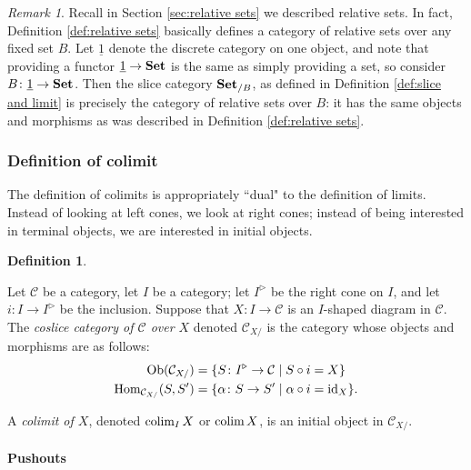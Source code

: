 \documentclass{book}
\def\tn{\textnormal}
\def\mc{\mathcal}
\def\Hom{\tn{Hom}}
\def\Ob{\tn{Ob}}
\def\rcone{^\triangleright}
\def\to{\rightarrow}
\def\taking{\colon}
\def\|{{\;|\;}}
\def\ul{\underline}
\def\id{\tn{id}}
\def\Set{{\bf Set}}
\def\colim{\mathop{\tn{colim}}}
\def\mcC{\mc{C}}
\theoremstyle{remark}
\newtheorem{remark}[subsubsection]{Remark}
\theoremstyle{definition}
\newtheorem{definition}[subsubsection]{Definition}
\begin{document}
\begin{remark}

Recall in Section \ref{sec:relative sets} we described relative sets. In fact, Definition \ref{def:relative sets} basically defines a category of relative sets over any fixed set $B$. Let $\ul{1}$ denote the discrete category on one object, and note that providing a functor $\ul{1}\to\Set$ is the same as simply providing a set, so consider $B\taking\ul{1}\to\Set$. Then the slice category $\Set_{/B}$, as defined in Definition \ref{def:slice and limit} is precisely the category of relative sets over $B$: it has the same objects and morphisms as was described in Definition \ref{def:relative sets}.

\end{remark}


\subsubsection{Definition of colimit}

The definition of colimits is appropriately ``dual" to the definition of limits. Instead of looking at left cones, we look at right cones; instead of being interested in terminal objects, we are interested in initial objects.

\begin{definition}\label{def:coslice and colimit}

Let $\mcC$ be a category, let $I$ be a category; let $I\rcone$ be the right cone on $I$, and let $i\taking I\to I\rcone$ be the inclusion. Suppose that $X\taking I\to\mcC$ is an $I$-shaped diagram in $\mcC$. The {\em coslice category of $\mcC$ over $X$} denoted $\mcC_{X/}$\index{a symbol!$\mcC_{X/}$} is the category whose objects and morphisms are as follows:
\begin{align*}
\Ob(\mcC_{X/})&=\{S\taking I\rcone\to\mcC\|S\circ i=X\}\\
\Hom_{\mcC_{X/}}(S,S')&=\{\alpha\taking S\to S'\|\alpha\circ i=\id_X\}.
\end{align*}

A {\em colimit of $X$}, denoted $\colim_IX$ or $\colim X$,\index{a symbol!$\colim$} is an initial object in $\mcC_{X/}$.

\end{definition}

\paragraph{Pushouts}
\end{document}
